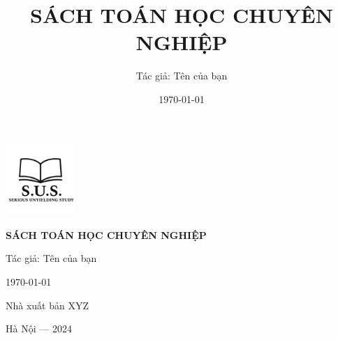 \documentclass[12pt,a4paper,twoside]{book} %
\title{SÁCH TOÁN HỌC CHUYÊN NGHIỆP}
\author{Tác giả: Tên của bạn}
\date{\today}
\begin{document}
\frontmatter

\begin{titlepage}
    \centering
    \vspace*{1cm}
    
    \includegraphics[width=0.2\textwidth]{images/logo.png}
    
    \vfill
    
    \parbox{0.8\textwidth}{
        \centering
        \sffamily %
        {\Huge\bfseries SÁCH TOÁN HỌC CHUYÊN NGHIỆP\par}
        \vspace{2cm}
        {\Large Tác giả: Tên của bạn\par}
        \vspace{1.5cm}
        {\large \today\par}
    }
    
    \vfill
    \vfill
    
    {\sffamily Nhà xuất bản XYZ\par}
    {\sffamily Hà Nội --- 2024\par}
\end{titlepage}

\tableofcontents




\mainmatter

% 

\backmatter
% 
% 
\end{document}
